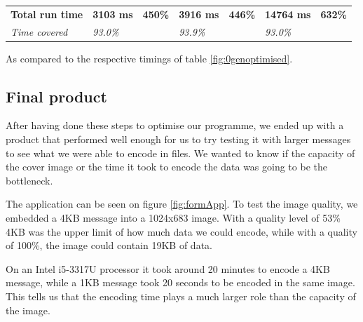 \begin{table}[H]
\begin{tabular}{@{}lllllll@{}}
        \textbf{Total run time} & \textbf{3103 ms}                                                                          & \textbf{450\%}                                                                 & \textbf{3916 ms}                                                                           & \textbf{446\%}                                                                & \textbf{14764 ms}                                                                       & \textbf{632\%}                                                                \\
        \textit{Time covered}   & \textit{93.0\%}                                                                           & \textit{}                                                                      & \textit{93.9\%}                                                                            &                                                                               & \textit{93.0\%}                                                                         & \textit{}                                                                     \\ \bottomrule
    \end{tabular}
    \begin{tablenotes}
        \footnotesize{\item \textdagger As compared to the respective timings of table \ref{fig:0genoptimised}.}
    \end{tablenotes}
\end{table}

\subsection{Final product}
After having done these steps to optimise our programme, we ended up with a product that performed well enough for us to try testing it with larger messages to see what we were able to encode in files.
We wanted to know if the capacity of the cover image or the time it took to encode the data was going to be the bottleneck.

The application can be seen on figure \ref{fig:formApp}.
To test the image quality, we embedded a 4KB message into a 1024x683 image.
With a quality level of 53\% 4KB was the upper limit of how much data we could encode, while with a quality of 100\%, the image could contain 19KB of data.

On an Intel{\textregistered} i5-3317U processor it took around 20 minutes to encode a 4KB message, while a 1KB message took 20 seconds to be encoded in the same image.
This tells us that the encoding time plays a much larger role than the capacity of the image.

